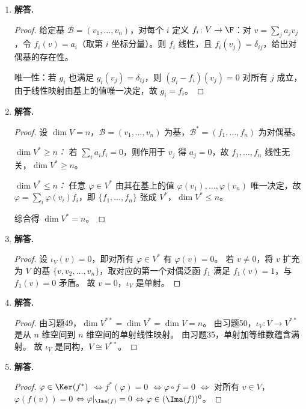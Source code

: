 \begin{enumerate}[label=\textbf{\arabic*.}, leftmargin=*, itemsep=1em]
\begin{proof}
$(\Leftarrow)$ 由习题46，$p^2=p$ 蕴含 $V=\Ker(p)\oplus\Ima(p)$，$p$ 即是沿 $\Ker(p)$ 到 $\Ima(p)$ 的投影。
\end{proof}

\item \textbf{解答.}
\begin{proof}
给定基 $\mathcal{B}=(v_1,\ldots,v_n)$，对每个 $i$ 定义 $f_i\colon V\to\F$：对 $v=\sum_j a_j v_j$，令 $f_i(v)=a_i$（取第 $i$ 坐标分量）。则 $f_i$ 线性，且 $f_i(v_j)=\delta_{ij}$，给出对偶基的存在性。

唯一性：若 $g_i$ 也满足 $g_i(v_j)=\delta_{ij}$，则 $(g_i-f_i)(v_j)=0$ 对所有 $j$ 成立，由于线性映射由基上的值唯一决定，故 $g_i=f_i$。
\end{proof}

\item \textbf{解答.}
\begin{proof}
设 $\dim V=n$，$\mathcal{B}=(v_1,\ldots,v_n)$ 为基，$\mathcal{B}^*=(f_1,\ldots,f_n)$ 为对偶基。

\emph{$\dim V^*\ge n$：} 若 $\sum_i a_i f_i=0$，则作用于 $v_j$ 得 $a_j=0$，故 $f_1,\ldots,f_n$ 线性无关，$\dim V^*\ge n$。

\emph{$\dim V^*\le n$：} 任意 $\varphi\in V^*$ 由其在基上的值 $\varphi(v_1),\ldots,\varphi(v_n)$ 唯一决定，故 $\varphi=\sum_i\varphi(v_i)f_i$，即 $\{f_1,\ldots,f_n\}$ 张成 $V^*$，$\dim V^*\le n$。

综合得 $\dim V^*=n$。
\end{proof}

\item \textbf{解答.}
\begin{proof}
设 $\iota_V(v)=0$，即对所有 $\varphi\in V^*$ 有 $\varphi(v)=0$。
若 $v\neq 0$，将 $v$ 扩充为 $V$ 的基 $\{v,v_2,\ldots,v_n\}$，取对应的第一个对偶泛函 $f_1$ 满足 $f_1(v)=1$，与 $f_1(v)=0$ 矛盾。
故 $v=0$，$\iota_V$ 是单射。
\end{proof}

\item \textbf{解答.}
\begin{proof}
由习题49，$\dim V^{**}=\dim V^*=\dim V=n$。
由习题50，$\iota_V\colon V\to V^{**}$ 是从 $n$ 维空间到 $n$ 维空间的单射线性映射。
由习题35，单射加等维数蕴含满射。
故 $\iota_V$ 是同构，$V\cong V^{**}$。
\end{proof}

\item \textbf{解答.}
\begin{proof}
$\varphi\in\Ker(f^*)$
$\Leftrightarrow f^*(\varphi)=0$
$\Leftrightarrow \varphi\circ f=0$
$\Leftrightarrow$ 对所有 $v\in V$，$\varphi(f(v))=0$
$\Leftrightarrow \varphi|_{\Ima(f)}=0$
$\Leftrightarrow \varphi\in(\Ima(f))^0$。


\end{proof}
\end{enumerate}
